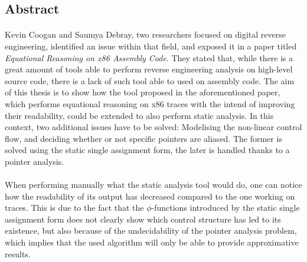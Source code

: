 \begin{vcenterpage}
\section*{Abstract}
\paragraph{}
Kevin Coogan and Saumya Debray, two researchers focused on digital reverse engineering, identified an issue within that field, and exposed it in a paper titled \textit{Equational Reasoning on x86 Assembly Code}\cite{coogan2011equational}. They stated that, while there is a great amount of tools able to perform reverse engineering analysis on high-level source code, there is a lack of such tool able to used on assembly code. The aim of this thesis is to show how the tool proposed in the aforementioned paper, which performs equational reasoning on x86 traces with the intend of improving their readability, could be extended to also perform static analysis. In this context, two additional issues have to be solved: Modelising the non-linear control flow, and deciding whether or not specific pointers are aliased. The former is solved using the static single assignment form, the later is handled thanks to a pointer analysis.
\paragraph{}
When performing manually what the static analysis tool would do, one can notice how the readability of its output has decreased compared to the one working on traces. This is due to the fact that the $\phi$-functions introduced by the static single assignment form does not clearly show which control structure has led to its existence, but also because of the undecidability of the pointer analysis problem, which implies that the used algorithm will only be able to provide approximative results.
\end{vcenterpage}







